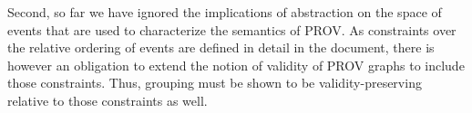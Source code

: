 Second, so far we have ignored the implications of abstraction on the space of events that are used to characterize the semantics of PROV. As constraints over the relative ordering of events are defined in detail in the  document, there is however an obligation to extend the notion of validity of PROV graphs to include those constraints. Thus, grouping must be shown to be validity-preserving relative to those constraints as well. 




